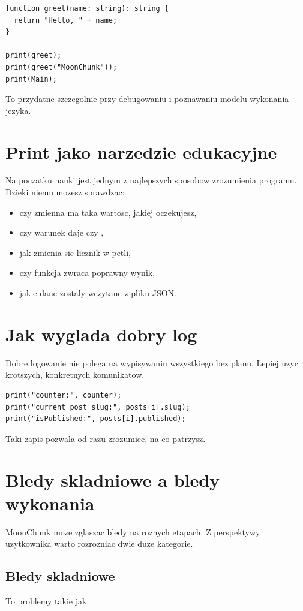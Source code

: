 \begin{lstlisting}[style=moonchunk,caption={Rozne rodzaje argumentow print}]
function greet(name: string): string {
  return "Hello, " + name;
}

print(greet);
print(greet("MoonChunk"));
print(Main);
\end{lstlisting}

To przydatne szczegolnie przy debugowaniu i poznawaniu modelu wykonania jezyka.

\section{Print jako narzedzie edukacyjne}
Na poczatku nauki  jest jednym z najlepszych sposobow zrozumienia programu.
Dzieki niemu mozesz sprawdzac:

\begin{itemize}
  \item czy zmienna ma taka wartosc, jakiej oczekujesz,
  \item czy warunek daje  czy ,
  \item jak zmienia sie licznik w petli,
  \item czy funkcja zwraca poprawny wynik,
  \item jakie dane zostaly wczytane z pliku JSON.
\end{itemize}

\section{Jak wyglada dobry log}
Dobre logowanie nie polega na wypisywaniu wszystkiego bez planu. Lepiej uzyc krotszych,
konkretnych komunikatow.

\begin{lstlisting}[style=moonchunk,caption={Czytelny styl logowania}]
print("counter:", counter);
print("current post slug:", posts[i].slug);
print("isPublished:", posts[i].published);
\end{lstlisting}

Taki zapis pozwala od razu zrozumiec, na co patrzysz.

\section{Bledy skladniowe a bledy wykonania}
MoonChunk moze zglaszac bledy na roznych etapach. Z perspektywy uzytkownika warto
rozrozniac dwie duze kategorie.

\subsection*{Bledy skladniowe}
To problemy takie jak:


